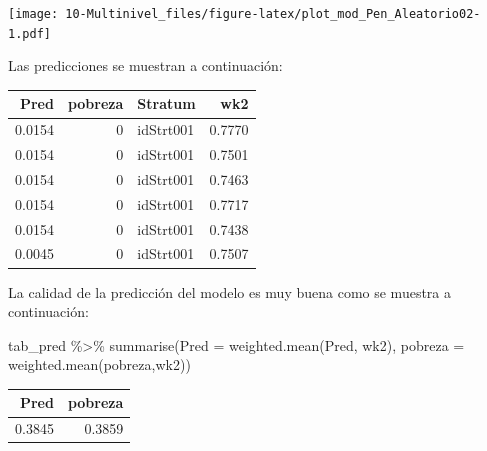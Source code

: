 \documentclass[
  12pt,
]{book}
\newenvironment{Shaded}{\begin{snugshade}}{\end{snugshade}}
\newcommand{\AttributeTok}[1]{\textcolor[rgb]{0.77,0.63,0.00}{#1}}
\newcommand{\DecValTok}[1]{\textcolor[rgb]{0.00,0.00,0.81}{#1}}
\newcommand{\FunctionTok}[1]{\textcolor[rgb]{0.00,0.00,0.00}{#1}}
\newcommand{\NormalTok}[1]{#1}
\newcommand{\OtherTok}[1]{\textcolor[rgb]{0.56,0.35,0.01}{#1}}
\newcommand{\SpecialCharTok}[1]{\textcolor[rgb]{0.00,0.00,0.00}{#1}}
\newcommand{\StringTok}[1]{\textcolor[rgb]{0.31,0.60,0.02}{#1}}
\begin{document}
\texttt{[image: 10-Multinivel\_files/figure-latex/plot\_mod\_Pen\_Aleatorio02-1.pdf]}

Las predicciones se muestran a continuación:

\begin{Shaded}
\end{Shaded}

\begin{tabular}{r|r|l|r}
\hline
Pred & pobreza & Stratum & wk2\\
\hline
0.0154 & 0 & idStrt001 & 0.7770\\
\hline
0.0154 & 0 & idStrt001 & 0.7501\\
\hline
0.0154 & 0 & idStrt001 & 0.7463\\
\hline
0.0154 & 0 & idStrt001 & 0.7717\\
\hline
0.0154 & 0 & idStrt001 & 0.7438\\
\hline
0.0045 & 0 & idStrt001 & 0.7507\\
\hline
\end{tabular}

La calidad de la predicción del modelo es muy buena como se muestra a continuación:

\begin{Shaded}
\begin{Highlighting}[]
\NormalTok{tab\_pred }\SpecialCharTok{\%\textgreater{}\%} 
  \FunctionTok{summarise}\NormalTok{(}\AttributeTok{Pred =} \FunctionTok{weighted.mean}\NormalTok{(Pred, wk2), }
            \AttributeTok{pobreza =} \FunctionTok{weighted.mean}\NormalTok{(pobreza,wk2))}
\end{Highlighting}
\end{Shaded}

\begin{tabular}{r|r}
\hline
Pred & pobreza\\
\hline
0.3845 & 0.3859\\
\hline
\end{tabular}
\end{document}
